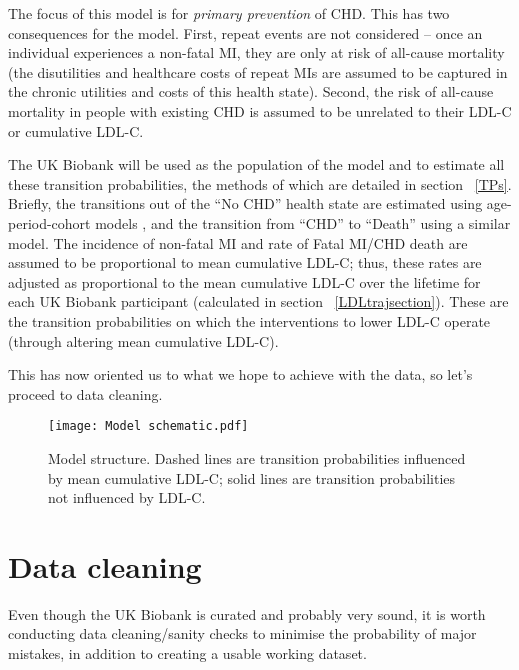 \documentclass[11pt]{article}
\begin{document}
The focus of this model is for \emph{primary prevention} of CHD. This has two consequences for the model. First, 
repeat events are not considered -- once an individual experiences a non-fatal MI, they are only at risk
of all-cause mortality (the disutilities and healthcare costs of repeat MIs are assumed to be captured in the
chronic utilities and costs of this health state). Second, the risk of all-cause mortality in people with 
existing CHD is assumed to be unrelated to their LDL-C or cumulative LDL-C. 

The UK Biobank will be used as the population of the model and 
to estimate all these transition probabilities, the methods of which are 
detailed in section ~\ref{TPs}. Briefly, the transitions out of the ``No CHD'' health state are 
estimated using age-period-cohort models \cite{CarstensenSTATMED2007}, and the transition from 
``CHD'' to ``Death'' using a similar model. The incidence of non-fatal MI and rate of Fatal MI/CHD death
are assumed to be proportional to mean cumulative LDL-C; thus, these rates are adjusted as proportional
to the mean cumulative LDL-C over the lifetime for each UK Biobank participant (calculated in section
~\ref{LDLtrajsection}). These are the transition probabilities on which the interventions to lower LDL-C
operate (through altering mean cumulative LDL-C). 

This has now oriented us to what we hope to achieve with the data, so let's proceed to data cleaning.

\begin{figure}
    \centering
    \texttt{[image: Model schematic.pdf]}
    \caption{Model structure. Dashed lines are transition probabilities influenced by mean cumulative LDL-C; solid lines are transition probabilities not influenced by LDL-C.}
    \label{Schematic}
\end{figure}

\clearpage
\pagebreak
\section{Data cleaning}

Even though the UK Biobank is curated and probably very sound, it is worth conducting data 
cleaning/sanity checks to minimise the probability of major mistakes, in addition to creating a 
usable working dataset. 
\end{document}

